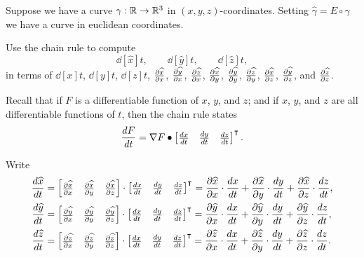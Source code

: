 \documentclass[newpage,hints,handout,12pt,noauthor,nooutcomes]{ximera}
\begin{document}
\begin{problem}
  Suppose we have a curve $\gamma:\R\to\R^3$ in
  $(x,y,z)$-coordinates. Setting $\hat \gamma = E\circ\gamma$ we have
  a curve in euclidean coordinates. 
  \begin{center}
  \end{center}
  
  Use the chain rule to compute
  \[
  \dd[\hat x]{t}, \qquad \dd[\hat y]{t}, \qquad \dd[\hat z]{t},
  \]
  in terms of $\dd[x]{t}$, $\dd[y]{t}$, $\dd[z]{t}$, $\pp[\hat x]{x}$, $\pp[\hat y]{x}$, $\pp[\hat z]{x}$,
  $\pp[\hat x]{y}$, $\pp[\hat y]{y}$, $\pp[\hat z]{y}$, $\pp[\hat x]{z}$, $\pp[\hat y]{z}$, and $\pp[\hat z]{z}$. 
  \begin{hint}
    Recall that if $F$ is a differentiable function of $x$, $y$, and
    $z$; and if $x$, $y$, and $z$ are all differentiable functions of
    $t$, then the chain rule states
    \[
    \dd[F]{t} = \nabla F \dot
    \begin{bmatrix}
      \dd[x]{t} & \dd[y]{t} & \dd[z]{t}
    \end{bmatrix}^\transpose.
    \]
  \end{hint}
  \begin{freeResponse}
    Write
    \begin{align*}
      \dd[\hat x]{t} &= \begin{bmatrix} \pp[\hat x]{x} & \pp[\hat x]{y} & \pp[\hat x]{z} \end{bmatrix} \cdot \begin{bmatrix} \dd[x]{t} & \dd[y]{t} & \dd[z]{t} \end{bmatrix}^\transpose
      = \pp[\hat x]{x}\cdot\dd[x]{t} + \pp[\hat x]{y}\cdot\dd[y]{t} + \pp[\hat x]{z}\cdot\dd[z]{t}, \\
      \dd[\hat y]{t} &= \begin{bmatrix} \pp[\hat y]{x} & \pp[\hat y]{y} & \pp[\hat y]{z} \end{bmatrix} \cdot \begin{bmatrix} \dd[x]{t} & \dd[y]{t} & \dd[z]{t} \end{bmatrix}^\transpose
      = \pp[\hat y]{x}\cdot\dd[x]{t} + \pp[\hat y]{y}\cdot\dd[y]{t} + \pp[\hat y]{z}\cdot\dd[z]{t}, \\
      \dd[\hat z]{t} &= \begin{bmatrix} \pp[\hat z]{x} & \pp[\hat z]{y} & \pp[\hat z]{z} \end{bmatrix} \cdot \begin{bmatrix} \dd[x]{t} & \dd[y]{t} & \dd[z]{t} \end{bmatrix}^\transpose
      = \pp[\hat z]{x}\cdot\dd[x]{t} + \pp[\hat z]{y}\cdot\dd[y]{t} + \pp[\hat z]{z}\cdot\dd[z]{t}.
    \end{align*}
  \end{freeResponse}
\end{problem}
\end{document}
